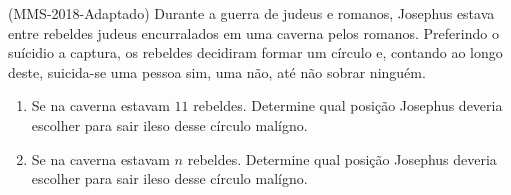 \item{(MMS-2018-Adaptado)}  Durante a guerra de judeus e romanos, Josephus estava entre rebeldes judeus encurralados
	  em uma   caverna pelos romanos. Preferindo o suícidio a captura, os rebeldes decidiram formar 
	  um círculo e, contando ao longo deste, suicida-se uma pessoa sim, uma não, até não sobrar
	  ninguém. 
	  \begin{enumerate}
		\item Se na caverna estavam $11$ rebeldes. Determine qual posição Josephus deveria escolher para sair ileso desse círculo malígno.
		\item Se na caverna estavam $n$ rebeldes. Determine qual posição Josephus deveria escolher para sair ileso desse círculo malígno.
	  \end{enumerate}


